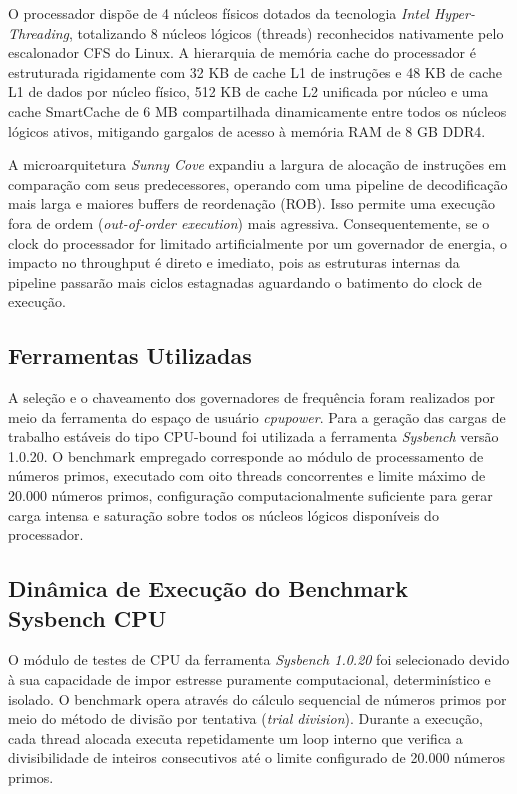 \documentclass[12pt]{article}
\begin{document}
O processador dispõe de 4 núcleos físicos dotados da tecnologia \textit{Intel Hyper-Threading}, totalizando 8 núcleos lógicos (threads) reconhecidos nativamente pelo escalonador CFS do Linux. A hierarquia de memória cache do processador é estruturada rigidamente com 32 KB de cache L1 de instruções e 48 KB de cache L1 de dados por núcleo físico, 512 KB de cache L2 unificada por núcleo e uma cache SmartCache de 6 MB compartilhada dinamicamente entre todos os núcleos lógicos ativos, mitigando gargalos de acesso à memória RAM de 8 GB DDR4.

A microarquitetura \textit{Sunny Cove} expandiu a largura de alocação de instruções em comparação com seus predecessores, operando com uma pipeline de decodificação mais larga e maiores buffers de reordenação (ROB). Isso permite uma execução fora de ordem (\textit{out-of-order execution}) mais agressiva. Consequentemente, se o clock do processador for limitado artificialmente por um governador de energia, o impacto no throughput é direto e imediato, pois as estruturas internas da pipeline passarão mais ciclos estagnadas aguardando o batimento do clock de execução.

\subsection{Ferramentas Utilizadas}

A seleção e o chaveamento dos governadores de frequência foram realizados por meio da ferramenta do espaço de usuário \textit{cpupower}. Para a geração das cargas de trabalho estáveis do tipo CPU-bound foi utilizada a ferramenta \textit{Sysbench} versão 1.0.20. O benchmark empregado corresponde ao módulo de processamento de números primos, executado com oito threads concorrentes e limite máximo de 20.000 números primos, configuração computacionalmente suficiente para gerar carga intensa e saturação sobre todos os núcleos lógicos disponíveis do processador.

\subsection{Dinâmica de Execução do Benchmark Sysbench CPU}

O módulo de testes de CPU da ferramenta \textit{Sysbench 1.0.20} foi selecionado devido à sua capacidade de impor estresse puramente computacional, determinístico e isolado. O benchmark opera através do cálculo sequencial de números primos por meio do método de divisão por tentativa (\textit{trial division}). Durante a execução, cada thread alocada executa repetidamente um loop interno que verifica a divisibilidade de inteiros consecutivos até o limite configurado de 20.000 números primos.
\end{document}
